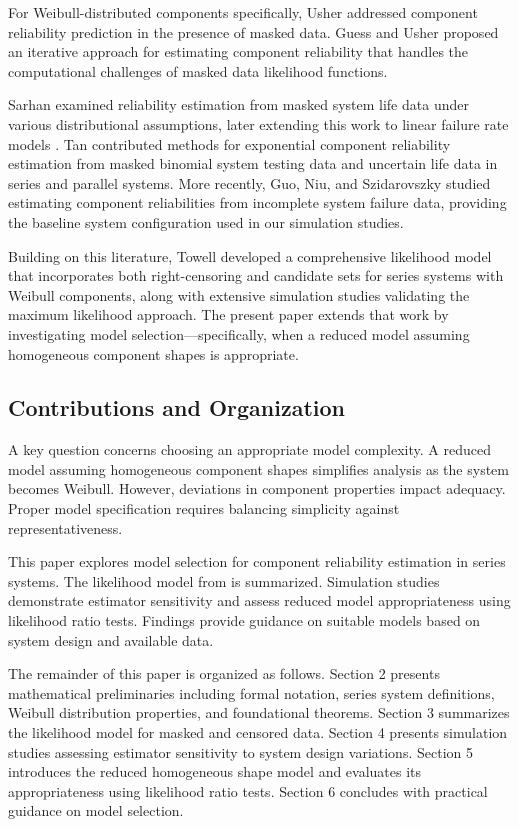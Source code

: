 \documentclass[11pt]{article}
\begin{document}
For Weibull-distributed components specifically, Usher \cite{Usher-1996} addressed component reliability prediction in the presence of masked data. Guess and Usher \cite{Joh-1989} proposed an iterative approach for estimating component reliability that handles the computational challenges of masked data likelihood functions.

Sarhan \cite{Amma-2001} examined reliability estimation from masked system life data under various distributional assumptions, later extending this work to linear failure rate models \cite{Amma-2004}. Tan \cite{Zhibi-2005, Zhibi-2007} contributed methods for exponential component reliability estimation from masked binomial system testing data and uncertain life data in series and parallel systems. More recently, Guo, Niu, and Szidarovszky \cite{Huairu-2013} studied estimating component reliabilities from incomplete system failure data, providing the baseline system configuration used in our simulation studies.

Building on this literature, Towell \cite{towell2023reliability} developed a comprehensive likelihood model that incorporates both right-censoring and candidate sets for series systems with Weibull components, along with extensive simulation studies validating the maximum likelihood approach. The present paper extends that work by investigating model selection---specifically, when a reduced model assuming homogeneous component shapes is appropriate.

\subsection{Contributions and Organization}

A key question concerns choosing an appropriate model complexity. A reduced model assuming homogeneous component shapes simplifies analysis as the system becomes Weibull. However, deviations in component properties impact adequacy. Proper model specification requires balancing simplicity against representativeness.

This paper explores model selection for component reliability estimation in series systems. The likelihood model from \cite{towell2023reliability} is summarized. Simulation studies demonstrate estimator sensitivity and assess reduced model appropriateness using likelihood ratio tests. Findings provide guidance on suitable models based on system design and available data.

The remainder of this paper is organized as follows. Section 2 presents mathematical preliminaries including formal notation, series system definitions, Weibull distribution properties, and foundational theorems. Section 3 summarizes the likelihood model for masked and censored data. Section 4 presents simulation studies assessing estimator sensitivity to system design variations. Section 5 introduces the reduced homogeneous shape model and evaluates its appropriateness using likelihood ratio tests. Section 6 concludes with practical guidance on model selection.
\end{document}
